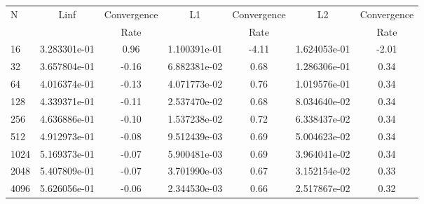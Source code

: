 \documentclass[12pt]{article}
\begin{document}
	\begin{tabular}{l|c|c|c|c|c|c}
		N&Linf&Convergence&L1&Convergence&L2&Convergence\\
		&&Rate&&Rate&&Rate\\
		\hline
		16&3.283301e-01&0.96&1.100391e-01&-4.11&1.624053e-01&-2.01\\
		\hline
		32&3.657804e-01&-0.16&6.882381e-02&0.68&1.286306e-01&0.34\\
		\hline
		64&4.016374e-01&-0.13&4.071773e-02&0.76&1.019576e-01&0.34\\
		\hline
		128&4.339371e-01&-0.11&2.537470e-02&0.68&8.034640e-02&0.34\\
		\hline
		256&4.636886e-01&-0.10&1.537238e-02&0.72&6.338437e-02&0.34\\
		\hline
		512&4.912973e-01&-0.08&9.512439e-03&0.69&5.004623e-02&0.34\\
		\hline
		1024&5.169373e-01&-0.07&5.900481e-03&0.69&3.964041e-02&0.34\\
		\hline
		2048&5.407809e-01&-0.07&3.701990e-03&0.67&3.152154e-02&0.33\\
		\hline
		4096&5.626056e-01&-0.06&2.344530e-03&0.66&2.517867e-02&0.32\\
	\end{tabular}
\end{document}
